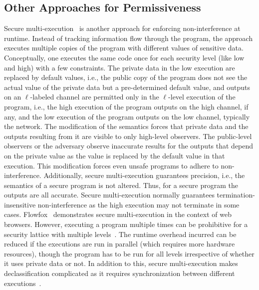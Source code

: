 \subsection{Other Approaches for Permissiveness}
Secure multi-execution~\cite{SME} is another approach for enforcing
non-interference at runtime. Instead of tracking information flow
through the program, the approach executes multiple copies of the
program with different values of sensitive data. Conceptually, one
executes the same code once for each security level (like low and
high) with a few constraints. The private data in the low execution
are replaced by default values, i.e., the public copy of the
program does not see the actual value of the private data but a
pre-determined default value, and outputs on an $\ell$-labeled channel 
are permitted only in the $\ell$-level execution of the program, i.e.,
the high execution of the program outputs on the high channel, if any,
and the low execution of the program outputs on the low channel,
typically the network. 
%
The modification of the semantics forces that private data and the
outputs resulting from it are visible to only high-level
observers. The public-level observers or the adversary observe
inaccurate results for the outputs that depend on the private value as
the value is replaced by the default value in that execution. 
This modification forces even unsafe programs to
adhere to non-interference. Additionally, secure multi-execution
guarantees precision, i.e., the semantics of a secure program is
not altered. Thus, for a secure program the outputs are all
accurate. Secure multi-execution normally guarantees
termination-insensitive non-interference as the high execution may not
terminate in some cases. Flowfox~\cite{flowfox} demonstrates secure 
multi-execution in the context of web browsers.
%
However, executing a program multiple times can be prohibitive for a
security lattice with multiple levels~\cite{austin12POPL}. The runtime
overhead incurred can be reduced if the executions are run in parallel
(which requires more hardware resources), though the program has 
to be run for all levels irrespective of whether it uses private data
or not. In addition to this, secure multi-execution makes
declassification complicated as it requires synchronization between
different executions~\cite{fineSME}. 

